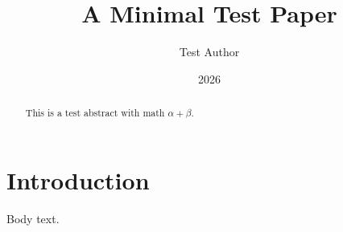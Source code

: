 \documentclass{article}
\title{A Minimal Test Paper}
\author{Test Author}
\date{2026}
\begin{document}
\maketitle
\begin{abstract}
This is a test abstract with math $\alpha + \beta$.
\end{abstract}
\section{Introduction}
Body text.
\end{document}
